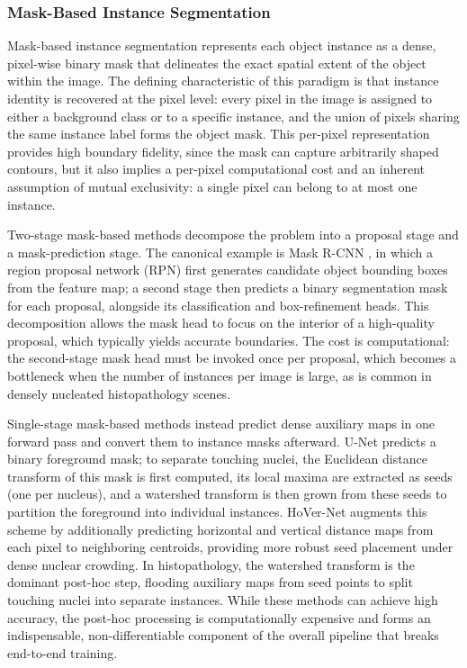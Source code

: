 \subsubsection{Mask-Based Instance Segmentation}
\label{sec:mask-based}

Mask-based instance segmentation represents each object instance as a dense, pixel-wise binary mask that delineates the exact spatial extent of the object within the image. The defining characteristic of this paradigm is that instance identity is recovered at the pixel level: every pixel in the image is assigned to either a background class or to a specific instance, and the union of pixels sharing the same instance label forms the object mask. This per-pixel representation provides high boundary fidelity, since the mask can capture arbitrarily shaped contours, but it also implies a per-pixel computational cost and an inherent assumption of mutual exclusivity: a single pixel can belong to at most one instance.


Two-stage mask-based methods decompose the problem into a proposal stage and a mask-prediction stage. The canonical example is Mask R-CNN \cite{he2017mask}, in which a region proposal network (RPN) first generates candidate object bounding boxes from the feature map; a second stage then predicts a binary segmentation mask for each proposal, alongside its classification and box-refinement heads. This decomposition allows the mask head to focus on the interior of a high-quality proposal, which typically yields accurate boundaries. The cost is computational: the second-stage mask head must be invoked once per proposal, which becomes a bottleneck when the number of instances per image is large, as is common in densely nucleated histopathology scenes.


Single-stage mask-based methods instead predict dense auxiliary maps in one forward pass and convert them to instance masks afterward. U-Net \cite{ronneberger2015u} predicts a binary foreground mask; to separate touching nuclei, the Euclidean distance transform of this mask is first computed, its local maxima are extracted as seeds (one per nucleus), and a watershed transform is then grown from these seeds to partition the foreground into individual instances. HoVer-Net \cite{graham2019hover} augments this scheme by additionally predicting horizontal and vertical distance maps from each pixel to neighboring centroids, providing more robust seed placement under dense nuclear crowding. In histopathology, the watershed transform is the dominant post-hoc step, flooding auxiliary maps from seed points to split touching nuclei into separate instances. While these methods can achieve high accuracy, the post-hoc processing is computationally expensive and forms an indispensable, non-differentiable component of the overall pipeline that breaks end-to-end training.

